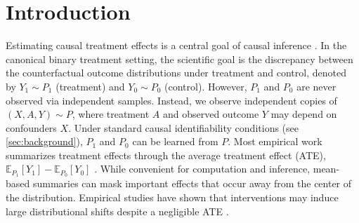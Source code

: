 \documentclass{article}
\theoremstyle{plain}
\theoremstyle{definition}
\theoremstyle{remark}
\newcommand{\E}{\mathbb{E}}
\newcommand{\1}{\mathbbm{1}}
\theoremstyle{plain}
\theoremstyle{definition}
\begin{document}
\begin{abstract}
  We introduce the Sinkhorn treatment effect, an entropic optimal transport measure of divergence between counterfactual distributions. Unlike classical quantities such as the average treatment effect, this measure captures differences across entire distributions. We analyze this divergence as a statistical functional and show it can be written as a smooth transformation of counterfactual mean embeddings with an appropriate kernel. This characterization allows us to establish first-order pathwise differentiability in general, and second-order pathwise differentiability under the null hypothesis of equal counterfactual distributions. Leveraging this smoothness, we construct debiased estimators and use them to obtain asymptotically valid tests for distributional treatment effects with a fixed entropic regularization parameter. Because the power of the test depends on this unknown parameter, we further propose an aggregated test that combines evidence across a grid of regularization choices. Experiments on simulated and image data demonstrate the practical advantages of our estimator and testing procedure.
\end{abstract}

\section{Introduction}\label{sec:introduction}
Estimating causal treatment effects is a central goal of causal inference \cite{rubin1974estimating,rubin2005causal, rosenbaum1983central, chernozhukov2017double}. In the canonical binary treatment setting, the scientific goal is the discrepancy between the counterfactual outcome distributions under treatment and control, denoted by $Y_1 \sim P_1$ (treatment) and $Y_0 \sim P_0$ (control). However, $P_1$ and $P_0$ are never observed via independent samples. Instead, we observe independent copies of $(X, A, Y) \sim P$, where treatment $A$ and {observed} outcome $Y$ may depend on confounders $X$. Under standard causal identifiability conditions (see \cref{sec:background}), $P_1$ and $P_0$ can be learned from $P$. Most empirical work summarizes treatment effects through the average treatment effect (ATE),  $\E_{P_1}[Y_1] - \E_{P_0}[Y_0]$ \cite{imbens2004nonparametric}. 
While convenient for computation and inference, mean-based summaries can mask important effects that occur away from the center of the distribution. Empirical studies have shown that interventions may induce large distributional shifts despite a negligible ATE \cite{bitler2006mean}.
\end{document}
